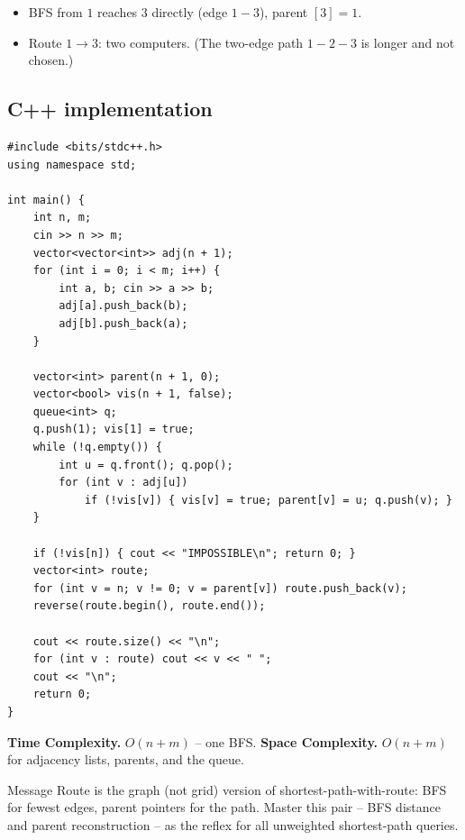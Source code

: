 
\begin{itemize}
  \item BFS from $1$ reaches $3$ directly (edge $1\!-\!3$), parent
        $[3]=1$.
  \item Route $1\to3$: two computers. (The two-edge path $1\!-\!2\!-\!3$
        is longer and not chosen.)
\end{itemize}

\subsection*{C++ implementation}

\begin{lstlisting}
#include <bits/stdc++.h>
using namespace std;

int main() {
    int n, m;
    cin >> n >> m;
    vector<vector<int>> adj(n + 1);
    for (int i = 0; i < m; i++) {
        int a, b; cin >> a >> b;
        adj[a].push_back(b);
        adj[b].push_back(a);
    }

    vector<int> parent(n + 1, 0);
    vector<bool> vis(n + 1, false);
    queue<int> q;
    q.push(1); vis[1] = true;
    while (!q.empty()) {
        int u = q.front(); q.pop();
        for (int v : adj[u])
            if (!vis[v]) { vis[v] = true; parent[v] = u; q.push(v); }
    }

    if (!vis[n]) { cout << "IMPOSSIBLE\n"; return 0; }
    vector<int> route;
    for (int v = n; v != 0; v = parent[v]) route.push_back(v);
    reverse(route.begin(), route.end());

    cout << route.size() << "\n";
    for (int v : route) cout << v << " ";
    cout << "\n";
    return 0;
}
\end{lstlisting}

\begin{complexitybox}
\textbf{Time Complexity.} $O(n+m)$ -- one BFS. \textbf{Space Complexity.}
$O(n+m)$ for adjacency lists, parents, and the queue.
\end{complexitybox}

\begin{takeawaybox}
Message Route is the graph (not grid) version of shortest-path-with-route:
BFS for fewest edges, parent pointers for the path. Master this pair --
BFS distance and parent reconstruction -- as the reflex for all unweighted
shortest-path queries.
\end{takeawaybox}
